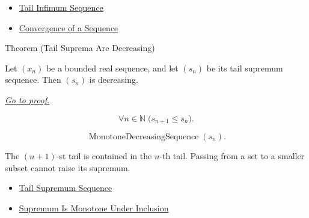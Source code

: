 \begin{dependencies}
\begin{itemize}
  \item \hyperref[def:tail-infimum-sequence]{Tail Infimum Sequence}
  \item \hyperref[def:convergent-sequence]{Convergence of a Sequence}
\end{itemize}
\end{dependencies}


\begin{theorembox}{Theorem (Tail Suprema Are Decreasing)}
\begin{theorem}
\label{thm:tail-suprema-are-decreasing}
Let $(x_n)$ be a bounded real sequence, and let $(s_n)$ be its tail
supremum sequence. Then $(s_n)$ is decreasing.

\smallskip
\noindent
\hyperref[prf:tail-suprema-are-decreasing]{\textit{Go to proof.}}
\end{theorem}
\end{theorembox}

\begin{remark*}
\[
\forall n\in\mathbb{N}\;\bigl(s_{n+1}\le s_n\bigr).
\]
\end{remark*}

\begin{remark*}
\[
\operatorname{MonotoneDecreasingSequence}(s_n).
\]
\end{remark*}

\begin{remark*}[Interpretation]
The $(n+1)$-st tail is contained in the $n$-th tail. Passing from a set to a
smaller subset cannot raise its supremum.
\end{remark*}

\begin{dependencies}
\begin{itemize}
  \item \hyperref[def:tail-supremum-sequence]{Tail Supremum Sequence}
  \item \hyperref[thm:supremum-is-monotone-under-inclusion]{Supremum Is Monotone Under Inclusion}
\end{itemize}
\end{dependencies}


